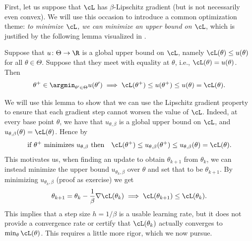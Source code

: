 \documentclass[../../book-main.tex]{subfiles}
\begin{document}
First, let us suppose that \(\cL\) has \(\beta\)-Lipschitz gradient
(but is not necessarily even convex). We will use this occasion to
introduce a common optimization theme: \textit{to minimize \(\cL\),
we can minimize an upper bound on \(\cL\)}, which is justified by the
following lemma visualized in .
\begin{lemma}\label{lem:majorization_minimization}
    Suppose that \(u \colon \Theta \to \R\) is a global upper bound
    on \(\cL\), namely \(\cL(\theta) \leq u(\theta)\) for all
    \(\theta \in \Theta\). Suppose that they meet with equality at
    \(\theta\), i.e., \(\cL(\theta) = u(\theta)\). Then
    \begin{equation}
        \theta^{+} \in \argmin_{\theta^{\prime} \in
        \Theta}u(\theta^{\prime}) \implies \cL(\theta^{+}) \leq
        u(\theta^{+}) \leq u(\theta) = \cL(\theta).
    \end{equation}
\end{lemma}

We will use this lemma to show that we can use the Lipschitz gradient
property to ensure that each gradient step cannot worsen the value of
\(\cL\). Indeed, at every base point \(\theta\), we have that
\(u_{\theta, \beta}\) is a global upper bound on \(\cL\), and
\(u_{\theta, \beta}(\theta) = \cL(\theta)\). Hence by
\begin{equation}
    \text{if \(\theta^{+}\) minimizes \(u_{\theta, \beta}\) then}
    \quad \cL(\theta^{+}) \leq u_{\theta, \beta}(\theta^{+}) \leq
    u_{\theta, \beta}(\theta) = \cL(\theta).
\end{equation}
This motivates us, when finding an update to obtain \(\theta_{k +
1}\) from \(\theta_{k}\), we can instead minimize the upper bound
\(u_{\theta_{k}, \beta}\) over \(\theta\) and set that to be
\(\theta_{k + 1}\). By minimizing \(u_{\theta_{k}, \beta}\) (proof as
exercise) we get
\begin{equation}\label{eq:GD}
    \theta_{k + 1} = \theta_{k} - \frac{1}{\beta}\nabla
    \cL(\theta_{k}) \implies \cL(\theta_{k + 1}) \leq \cL(\theta_{k}).
\end{equation}
This implies that a step size \(h = 1/\beta\) is a usable learning
rate, but it does not provide a convergence rate or certify that
\(\cL(\theta_{k})\) actually converges to \(\min_{\theta}\cL(\theta)\).
This requires a little more rigor, which we now pursue.
\end{document}
